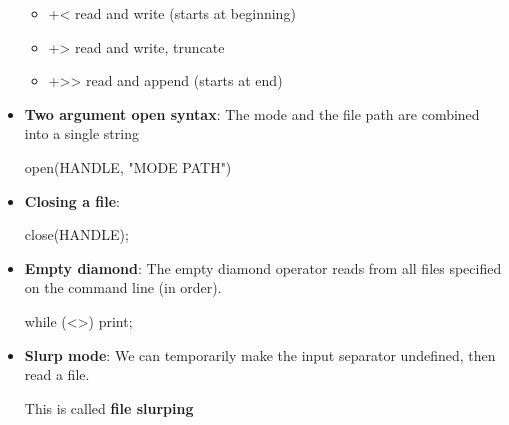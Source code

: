 \documentclass{report}
\begin{document}
\begin{itemize}
\begin{itemize}
                \item +<    read and write (starts at beginning)
                \item +>    read and write, truncate
                \item +>>   read and append (starts at end)
            \end{itemize}
        \item \textbf{Two argument open syntax}: The mode and the file path are combined into a single string
            \bigbreak \noindent 
            \begin{perlcode}
            open(HANDLE, "MODE PATH")
            \end{perlcode}
        \item \textbf{Closing a file}: 
            \bigbreak \noindent 
            \begin{perlcode}
            close(HANDLE);
            \end{perlcode}
        \item \textbf{Empty diamond}: The empty diamond operator reads from all files specified on the command line (in order).
            \bigbreak \noindent 
            \begin{perlcode}
                while (<>) {
                    print;
                }
            \end{perlcode}
        \item \textbf{Slurp mode}: We can temporarily make the input separator undefined, then read a file.
            \bigbreak \noindent 
            \bigbreak \noindent 
            This is called \textbf{file slurping}

    \end{itemize}

    \pagebreak 
\end{document}
